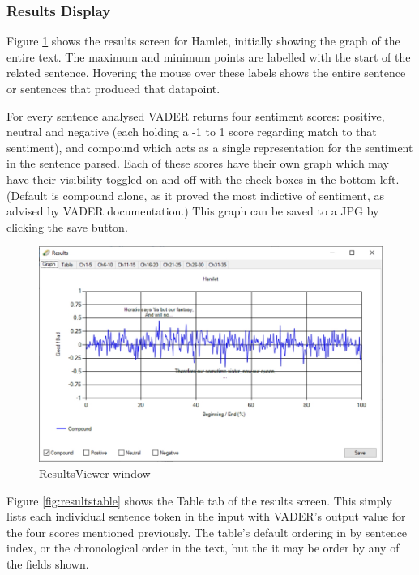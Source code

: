 \documentclass{article}
\begin{document}
    \subsubsection{Results Display}
        Figure \ref{fig:resultsviewer} shows the results screen for Hamlet, initially showing the graph of the entire text. The maximum and minimum points are labelled with the start of the related sentence. Hovering the mouse over these labels shows the entire sentence or sentences that produced that datapoint.

        For every sentence analysed VADER returns four sentiment scores: positive, neutral and negative (each holding a -1 to 1 score regarding match to that sentiment), and compound which acts as a single representation for the sentiment in the sentence parsed. Each of these scores have their own graph which may have their visibility toggled on and off with the check boxes in the bottom left. (Default is compound alone, as it proved the most indictive of sentiment, as advised by VADER documentation.) This graph can be saved to a JPG by clicking the save button.
        \begin{figure}[H]
            \includegraphics[width=1\textwidth]{Misc/resultsviewer}
            \caption{ResultsViewer window}
            \label{fig:resultsviewer}
        \end{figure}
        Figure \ref{fig:resultstable} shows the Table tab of the results screen. This simply lists each individual sentence token in the input with VADER’s output value for the four scores mentioned previously. The table’s default ordering in by sentence index, or the chronological order in the text, but the it may be order by any of the fields shown.
\end{document}
